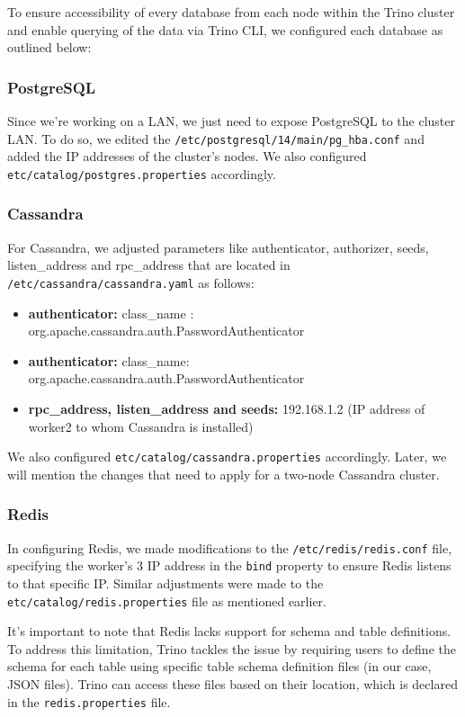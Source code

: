 \documentclass[conference]{IEEEtran}
\begin{document}
To ensure accessibility of every database from each node within the Trino cluster and enable querying of the data via Trino CLI, we configured each database as outlined below:

\subsubsection{PostgreSQL}

Since we're working on a LAN, we just need to expose PostgreSQL to the cluster LAN. To do so, we edited the \texttt{/etc/postgresql/14/main/pg\_hba.conf} and added
the IP addresses of the cluster's nodes. We also configured \texttt{etc/catalog/postgres.properties} accordingly.

\subsubsection{Cassandra}

For Cassandra, we adjusted parameters like authenticator, authorizer, seeds, listen\_address and rpc\_address that are located in \texttt{/etc/cassandra/cassandra.yaml} as follows:

\begin{itemize}
    \item \textbf{authenticator:} class\_name : org.apache.cassandra.auth.PasswordAuthenticator
    \item \textbf{authenticator:}
        class\_name: org.apache.cassandra.auth.PasswordAuthenticator
    \item \textbf{rpc\_address, listen\_address and seeds:} 192.168.1.2 (IP address of worker2 to whom Cassandra is installed)
\end{itemize}

We also configured \texttt{etc/catalog/cassandra.properties} accordingly. Later, we will mention the changes that need to apply for a two-node Cassandra cluster.

\subsubsection{Redis}


In configuring Redis, we made modifications to the \texttt{/etc/redis/redis.conf} file, specifying the worker's 3 IP address in the \texttt{bind} property 
to ensure Redis listens to that specific IP. Similar adjustments were made to the \texttt{etc/catalog/redis.properties} file as mentioned earlier.

It's important to note that Redis lacks support for schema and table definitions. To address this limitation, Trino tackles the issue by requiring users to 
define the schema for each table using specific table schema definition files (in our case, JSON files). Trino can access these files based on their location, which is declared in the \texttt{redis.properties} file.
\end{document}
